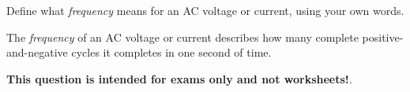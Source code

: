 

Define what {\it frequency} means for an AC voltage or current, using your own words.







The {\it frequency} of an AC voltage or current describes how many complete positive-and-negative cycles it completes in one second of time.







{\bf This question is intended for exams only and not worksheets!}.




